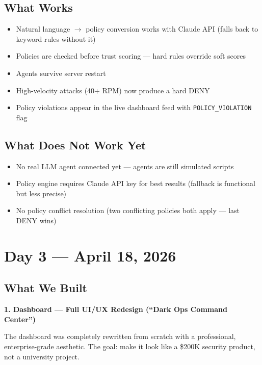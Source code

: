 \documentclass[12pt, a4paper]{article}
\begin{document}
\subsection{What Works}

\begin{itemize}[noitemsep]
  \item Natural language $\rightarrow$ policy conversion works with Claude API (falls back to keyword rules without it)
  \item Policies are checked before trust scoring — hard rules override soft scores
  \item Agents survive server restart
  \item High-velocity attacks (40+ RPM) now produce a hard DENY
  \item Policy violations appear in the live dashboard feed with \texttt{POLICY\_VIOLATION} flag
\end{itemize}

\subsection{What Does Not Work Yet}

\begin{itemize}[noitemsep]
  \item No real LLM agent connected yet — agents are still simulated scripts
  \item Policy engine requires Claude API key for best results (fallback is functional but less precise)
  \item No policy conflict resolution (two conflicting policies both apply — last DENY wins)
\end{itemize}

\section{Day 3 — April 18, 2026}

\subsection{What We Built}

\textbf{1. Dashboard — Full UI/UX Redesign (``Dark Ops Command Center'')}

The dashboard was completely rewritten from scratch with a professional,
enterprise-grade aesthetic. The goal: make it look like a \$200K security
product, not a university project.
\end{document}
